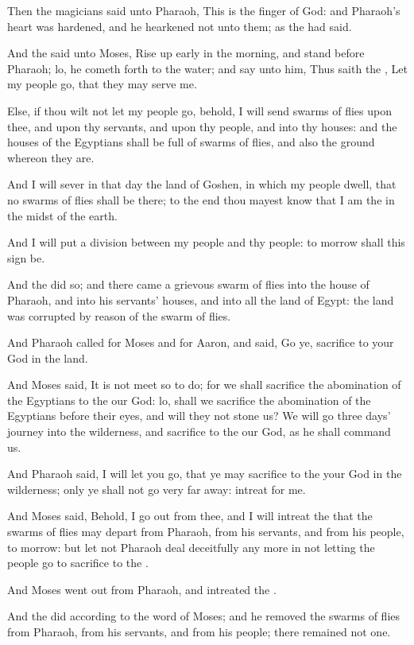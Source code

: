 \Verse Then the magicians said unto Pharaoh, This is the finger of God: and Pharaoh's heart was hardened, and he hearkened not unto them; as the \LORD had said.

\Verse And the \LORD said unto Moses, Rise up early in the morning, and stand before Pharaoh; lo, he cometh forth to the water; and say unto him, Thus saith the \LORD, Let my people go, that they may serve me.

\Verse Else, if thou wilt not let my people go, behold, I will send swarms of flies upon thee, and upon thy servants, and upon thy people, and into thy houses: and the houses of the Egyptians shall be full of swarms of flies, and also the ground whereon they are.

\Verse And I will sever in that day the land of Goshen, in which my people dwell, that no swarms of flies shall be there; to the end thou mayest know that I am the \LORD in the midst of the earth.

\Verse And I will put a division between my people and thy people: to morrow shall this sign be.

\Verse And the \LORD did so; and there came a grievous swarm of flies into the house of Pharaoh, and into his servants' houses, and into all the land of Egypt: the land was corrupted by reason of the swarm of flies.

\Verse And Pharaoh called for Moses and for Aaron, and said, Go ye, sacrifice to your God in the land.

\Verse And Moses said, It is not meet so to do; for we shall sacrifice the abomination of the Egyptians to the \LORD our God: lo, shall we sacrifice the abomination of the Egyptians before their eyes, and will they not stone us?  \Verse We will go three days' journey into the wilderness, and sacrifice to the \LORD our God, as he shall command us.

\Verse And Pharaoh said, I will let you go, that ye may sacrifice to the \LORD your God in the wilderness; only ye shall not go very far away: intreat for me.

\Verse And Moses said, Behold, I go out from thee, and I will intreat the \LORD that the swarms of flies may depart from Pharaoh, from his servants, and from his people, to morrow: but let not Pharaoh deal deceitfully any more in not letting the people go to sacrifice to the \LORD.

\Verse And Moses went out from Pharaoh, and intreated the \LORD.

\Verse And the \LORD did according to the word of Moses; and he removed the swarms of flies from Pharaoh, from his servants, and from his people; there remained not one.

